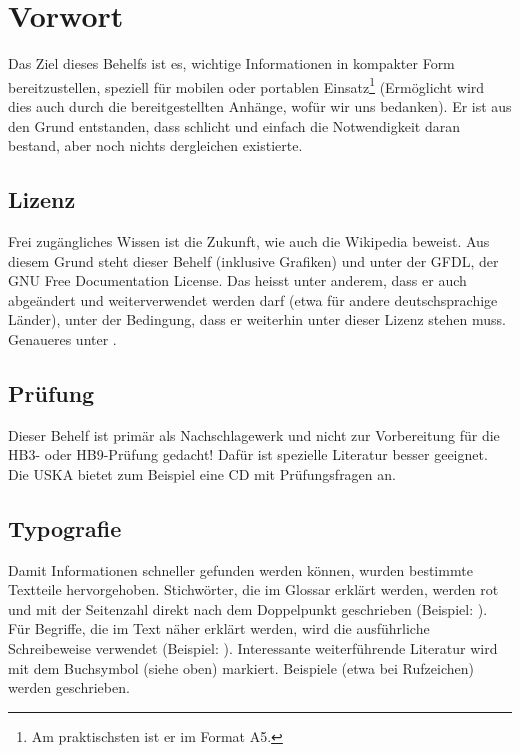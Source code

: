 \chapter{Vorwort}
Das Ziel dieses Behelfs ist es, wichtige Informationen in kompakter Form bereitzustellen, speziell für mobilen oder portablen Einsatz\footnote{Am praktischsten ist er im Format A5.} (Ermöglicht wird dies auch durch die bereitgestellten Anhänge, wofür wir uns bedanken). Er ist aus den Grund entstanden, dass schlicht und einfach die Notwendigkeit daran bestand, aber noch nichts dergleichen existierte.

\section{Lizenz}
Frei zugängliches Wissen ist die Zukunft, wie auch die Wikipedia beweist. Aus diesem Grund steht dieser Behelf (inklusive Grafiken) und unter der GFDL, der GNU Free Documentation License. Das heisst unter anderem, dass er auch abgeändert und weiterverwendet werden darf (etwa für andere deutschsprachige Länder), unter der Bedingung, dass er weiterhin unter dieser Lizenz stehen muss. Genaueres unter .

\section{Prüfung}

Dieser Behelf ist primär als Nachschlagewerk und nicht zur Vorbereitung für die HB3- oder HB9-Prüfung gedacht! Dafür ist spezielle Literatur besser geeignet. Die USKA bietet zum Beispiel eine CD mit Prüfungsfragen an.

\section{Typografie}

Damit Informationen schneller gefunden werden können, wurden bestimmte Textteile hervorgehoben. Stichwörter, die im Glossar erklärt werden, werden rot und mit der Seitenzahl direkt nach dem Doppelpunkt geschrieben (Beispiel: ). Für Begriffe, die im Text näher erklärt werden, wird die ausführliche Schreibeweise verwendet (Beispiel: ). Interessante weiterführende Literatur wird mit dem Buchsymbol (siehe oben) markiert. Beispiele (etwa bei Rufzeichen) werden  geschrieben.

